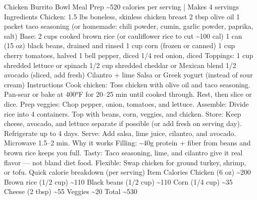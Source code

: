 Chicken Burrito Bowl Meal Prep \~{}520 calories per serving | Makes 4 servings Ingredients Chicken: 1.5 lbs boneless, skinless chicken breast 2 tbsp olive oil 1 packet taco seasoning (or homemade: chili powder, cumin, garlic powder, paprika, salt) Base: 2 cups cooked brown rice (or cauliflower rice to cut \~{}100 cal) 1 can (15 oz) black beans, drained and rinsed 1 cup corn (frozen or canned) 1 cup cherry tomatoes, halved 1 bell pepper, diced 1/4 red onion, diced Toppings: 1 cup shredded lettuce or spinach 1/2 cup shredded cheddar or Mexican blend 1/2 avocado (sliced, add fresh) Cilantro + lime Salsa or Greek yogurt (instead of sour cream) Instructions Cook chicken: Toss chicken with olive oil and taco seasoning. Pan-sear or bake at 400°F for 20–25 min until cooked through. Rest, then slice or dice. Prep veggies: Chop pepper, onion, tomatoes, and lettuce. Assemble: Divide rice into 4 containers. Top with beans, corn, veggies, and chicken. Store: Keep cheese, avocado, and lettuce separate if possible (or add fresh on serving day). Refrigerate up to 4 days. Serve: Add salsa, lime juice, cilantro, and avocado. Microwave 1.5–2 min. Why it works Filling: \~{}40g protein + fiber from beans and brown rice keeps you full. Tasty: Taco seasoning, lime, and cilantro give it real flavor — not bland diet food. Flexible: Swap chicken for ground turkey, shrimp, or tofu. Quick calorie breakdown (per serving) Item Calories Chicken (6 oz) \~{}200 Brown rice (1/2 cup) \~{}110 Black beans (1/2 cup) \~{}110 Corn (1/4 cup) \~{}35 Cheese (2 tbsp) \~{}55 Veggies \~{}20 Total \~{}530
\par

